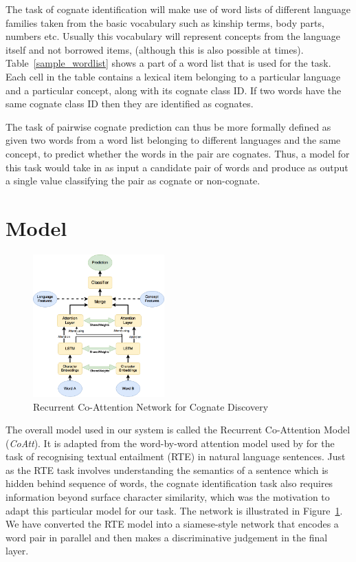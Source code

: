 \documentclass[11pt,letterpaper]{article}
\begin{document}
The task of cognate identification will make use of word lists of different language families taken from the basic vocabulary such as kinship terms, body parts, numbers etc. Usually this vocabulary will represent concepts from the language itself and not borrowed items, (although this is also possible at times). Table~\ref{sample_wordlist} shows a part of a word list that is used for the task. Each cell in the table contains a lexical item belonging to a particular language and a particular concept, along with its cognate class ID. If two words have the same cognate class ID then they are identified as cognates.

The task of pairwise cognate prediction can thus be more formally defined as given two words from a word list belonging to different languages and the same concept, to predict whether the words in the pair are cognates. Thus, a model for this task would take in as input a candidate pair of words and produce as output a single value classifying the pair as cognate or non-cognate. 

\section{Model}

\begin{figure}[t]
	\centering
	\includegraphics[width=0.45\textwidth]{CoAttNetwork}
    \caption{Recurrent Co-Attention Network for Cognate Discovery}
    \label{CoAttNet}
\end{figure}

The overall model used in our system is called the Recurrent Co-Attention Model (\textit{CoAtt}). It is adapted from the word-by-word attention model used by \cite{rocktaschel2016reasoning} for the task of recognising textual entailment (RTE) in natural language sentences. Just as the RTE task involves understanding the semantics of a sentence which is hidden behind sequence of words, the cognate identification task also requires information beyond surface character similarity, which was the motivation to adapt this particular model for our task. The network is illustrated in Figure~\ref{CoAttNet}. We have converted the RTE model into a siamese-style network that encodes a word pair in parallel and then makes a discriminative judgement in the final layer. 
\end{document}
